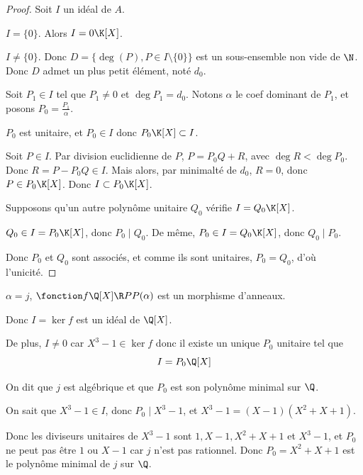 \begin{proof}
    Soit $I$ un idéal de $A$. 

     $I = \{0\}$. Alors $I = 0 \K[X]$.

     $I \neq \{0\}$. Donc $D = \{\deg(P), P \in I \setminus \{0\}\}$ 
    est un sous-ensemble non vide de $\N$. Donc $D$ admet un plus petit élément, noté $d_0$.

    Soit $P_1 \in I$ tel que $P_1 \neq 0 $ et $\deg P_1 = d_0$. Notons $\alpha$ le coef dominant 
    de $P_1$, et posons $P_0 = \frac{P_1} \alpha$. 

    $P_0$ est unitaire, et $P_0 \in I$ donc $P_0 \K[X] \subset I$.

    \avspace Soit $P \in I$. Par division euclidienne de $P$, $P = P_0 Q + R$, avec 
    $\deg R < \deg P_0$. Donc $R = P - P_0 Q \in I$. Mais alors, par minimalté de $d_0$,
    $R = 0$, donc $P \in P_0 \K[X]$. Donc $I \subset P_0 \K[X]$.

    \lvspace Supposons qu'un autre polynôme unitaire $Q_0$ vérifie $I = Q_0 \K[X]$.

    $Q_0 \in I = P_0 \K[X]$, donc $P_0 \mid Q_0$. De même, $P_0 \in I = Q_0 \K[X]$, donc $Q_0 \mid P_0$.

    Donc $P_0$ et $Q_0$ sont associés, et comme ils sont unitaires, $P_0 = Q_0$, d'où l'unicité.
\end{proof}

\begin{exemple}
    $\alpha = j$, $\fonction f {\Q[X]}\R P {P(\alpha)}$ est un morphisme d'anneaux.

    Donc $I = \ker f$ est un idéal de $\Q[X]$.

    De plus, $I \neq 0$ car $X^3 - 1 \in \ker f$ donc il existe un unique $P_0$ unitaire
    tel que $$I = P_0 \Q[X]$$

    On dit que $j$ est algébrique et que $P_0$ est son polynôme minimal sur $\Q$.

    On sait que $X^3 - 1 \in I$, donc $P_0 \mid X^3 - 1$, et 
    $X^3 - 1 = (X - 1)(X^2 + X + 1)$. 

    Donc les diviseurs unitaires de $X^3 - 1$ sont $1, X - 1, X^2 + X + 1$ et $X^3 - 1$, et 
    $P_0$ ne peut pas être $1$ ou $X - 1$ car $j$ n'est pas rationnel. 
    Donc $P_0 = X^2 + X + 1$ est le polynôme minimal de $j$ sur $\Q$.


\end{exemple}

